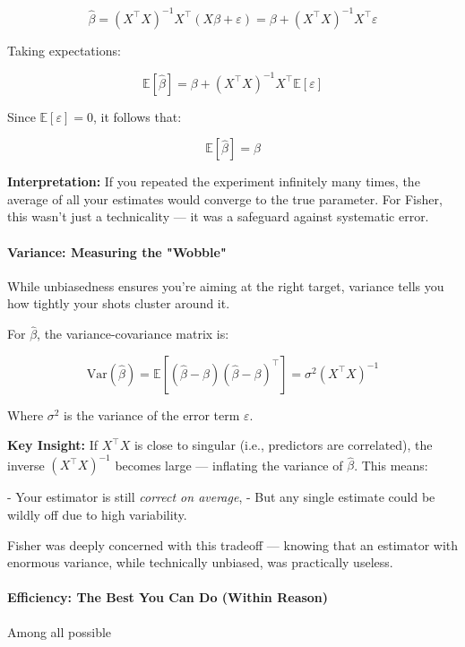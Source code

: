 \[
\hat{\beta} = (X^\top X)^{-1} X^\top (X\beta + \varepsilon) = \beta + (X^\top X)^{-1} X^\top \varepsilon
\]

Taking expectations:

\[
\mathbb{E}[\hat{\beta}] = \beta + (X^\top X)^{-1} X^\top \mathbb{E}[\varepsilon]
\]

Since \( \mathbb{E}[\varepsilon] = 0 \), it follows that:

\[
\mathbb{E}[\hat{\beta}] = \beta
\]

\textbf{Interpretation:} If you repeated the experiment infinitely many times, the average of all your estimates would converge to the true parameter. For Fisher, this wasn’t just a technicality — it was a safeguard against systematic error.

\medskip

\paragraph{\textbf{Variance: Measuring the "Wobble"}}

While unbiasedness ensures you're aiming at the right target, variance tells you how tightly your shots cluster around it.

For \( \hat{\beta} \), the variance-covariance matrix is:

\[
\mathrm{Var}(\hat{\beta}) = \mathbb{E} \left[ (\hat{\beta} - \beta)(\hat{\beta} - \beta)^\top \right] = \sigma^2 (X^\top X)^{-1}
\]

Where \( \sigma^2 \) is the variance of the error term \( \varepsilon \).

\textbf{Key Insight:}  
If \( X^\top X \) is close to singular (i.e., predictors are correlated), the inverse \( (X^\top X)^{-1} \) becomes large — inflating the variance of \( \hat{\beta} \). This means:

- Your estimator is still \textit{correct on average},  
- But any single estimate could be wildly off due to high variability.

Fisher was deeply concerned with this tradeoff — knowing that an estimator with enormous variance, while technically unbiased, was practically useless.

\medskip

\paragraph{\textbf{Efficiency: The Best You Can Do (Within Reason)}}

Among all possible



